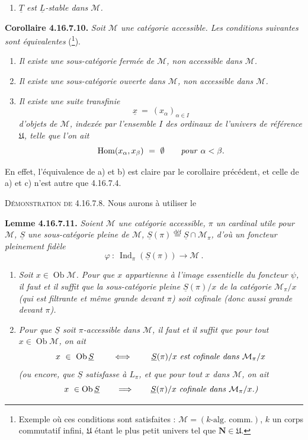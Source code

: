 \documentclass[11pt]{article}
\newcommand{\printedpage}[1]{\marginpar{\footnotesize p.~#1}}
\newcommand{\msp}[1]{\marginpar{\footnotesize [#1]}}
\newcommand{\cM}{\mathcal{M}}
\newcommand{\Ob}{\operatorname{Ob}}
\newcommand{\Hom}{\operatorname{Hom}}
\newcommand{\Ind}{\operatorname{Ind}}
\newcommand{\defeq}{\overset{\text{déf}}{=}}
\begin{document}
\printedpage{189}

\begin{enumerate}
\item[\textit{b$'$)}] \textit{$\underline{T}$ est $\underline{L}$-stable dans $\cM$.}
\end{enumerate}

\noindent\textbf{Corollaire 4.16.7.10.} \textit{Soit $\cM$ une catégorie accessible. Les conditions suivantes sont équivalentes} (\footnote[202]{Exemple où ces conditions sont satisfaites : $\cM = (k\text{-alg. comm.})$, $k$ un corps commutatif infini, $\mathfrak{U}$ étant le plus petit univers tel que $\mathbf{N}\in\mathfrak{U}$.}).
\begin{enumerate}
\item[\textit{a)}] \textit{Il existe une sous-catégorie fermée de $\cM$, non accessible dans $\cM$.}
\item[\textit{b)}] \textit{Il existe une sous-catégorie ouverte dans $\cM$, non accessible dans $\cM$.}
\item[\textit{c)}] \textit{Il existe une suite transfinie}
\[
\underline{x} \ = \ (x_\alpha)_{\alpha\in I}
\]
\textit{d'objets de $\cM$, indexée par l'ensemble $I$ des ordinaux de l'univers de référence $\mathfrak{U}$, telle que l'on ait}
\[
\Hom(x_\alpha,x_\beta) \ = \ \emptyset \qquad \text{\textit{pour} } \alpha<\beta .
\]
\end{enumerate}

\noindent En effet, l'équivalence de a) et b) est claire par le corollaire précédent, et celle de a) et c) n'est autre que 4.16.7.4.

\noindent\textsc{Démonstration de} 4.16.7.8. Nous aurons à utiliser le

\noindent\textbf{Lemme 4.16.7.11.} \textit{Soient $\cM$ une catégorie accessible, $\pi$ un cardinal utile pour $\cM$, $\underline{S}$ une sous-catégorie pleine de $\cM$, $\underline{S}(\pi)\defeq\underline{S}\cap\cM_\pi$, d'où un foncteur pleinement fidèle}
\[
\varphi \ : \ \Ind_\pi(\underline{S}(\pi)) \longrightarrow \cM \ .
\]

\msp{page 489}
\begin{enumerate}
\item[\textit{a)}] \textit{Soit $x\in\Ob\cM$. Pour que $x$ appartienne à l'image essentielle du foncteur $\psi$, il faut et il suffit que la sous-catégorie pleine $\underline{S}(\pi)/x$ de la catégorie $\cM_\pi/x$ (qui est filtrante et même grande devant $\pi$) soit cofinale (donc aussi grande devant $\pi$).} %
\item[\textit{b)}] \textit{Pour que $\underline{S}$ soit $\pi$-accessible dans $\cM$, il faut et il suffit que pour tout $x\in\Ob\cM$, on ait}
\[
x \ \in \ \Ob\underline{S} \qquad\iff\qquad \underline{S}(\pi)/x \text{ \textit{est cofinale dans} } \cM_\pi/x
\]
\textit{(ou encore, que $\underline{S}$ satisfasse à $L_\pi$, et que pour tout $x$ dans $\cM$, on ait}
\[
x \ \in\Ob\underline{S} \qquad\Longrightarrow\qquad \underline{S}(\pi)/x \text{ \textit{cofinale dans} } \cM_\pi/x\text{\textit{.)}}
\]
\end{enumerate}
\end{document}
